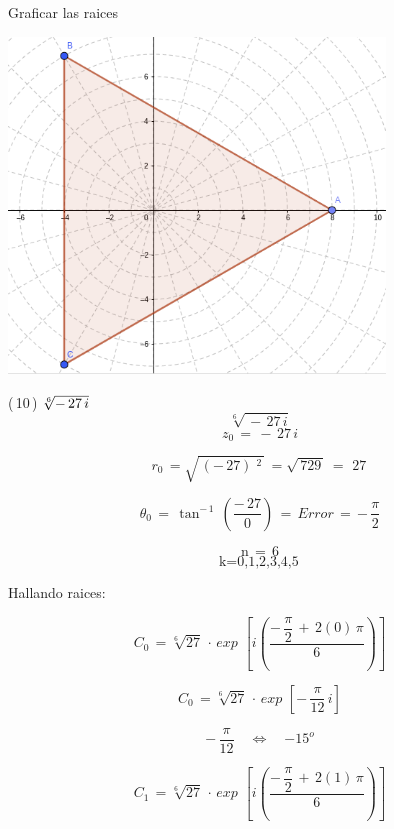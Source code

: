 \documentclass[a4paper,11pt,openany]{book}
\begin{document}
\textcolor{ao(english)}{} Graficar las raices

\begin{center}
    \includegraphics[width=10cm]{Gra-Ej-9.png}
\end{center}

\textcolor{ao(english)}{(\,10\,)} $\bf{\sqrt[6]{-\,27\,i}}$\\

$$\sqrt[6]{\,-\,27\,i}$$
$$z_0\,= \,-\,27\,i$$

\textcolor{ao(english)}{}

$$r_0\,=\sqrt{\,(-\,27)\,^{\,2}\,}\,=\sqrt{\,729\,}\,=\,\boxed{\,27\,}$$

\textcolor{ao(english)}{}

$$\theta_0\,=\,\tan^{-\,1}\,\left(\dfrac{-\,27}{0}\right)\,=\,Error\,=\,\boxed{-\,\dfrac{\pi}{2}}$$

$$\text{n}\,=\,6$$
$$\text{k={0,1,2,3,4,5}}\,$$

Hallando raices:\\


\textcolor{ao(english)}{}

$$C_0\,=\sqrt[6]{27}\,\cdot\,exp\,{\,\left[i\left(  \dfrac{-\,\dfrac{\pi}{2}\,+\,2(0)\,\pi}{6}\right)\right]}$$

$$C_0\,=\sqrt[6]{27}\,\cdot\,exp\,{\,\left[-\,\dfrac{\pi}{12}\,i\right]}$$

$$-\,\dfrac{\pi}{12} \quad\iff\quad \boxed{-15^{o}}$$

\textcolor{ao(english)}{}

$$C_1\,=\sqrt[6]{27}\,\cdot\,exp\,{\,\left[i\left(  \dfrac{-\,\dfrac{\pi}{2}\,+\,2(1)\,\pi}{6}\right)\right]}$$
\end{document}
